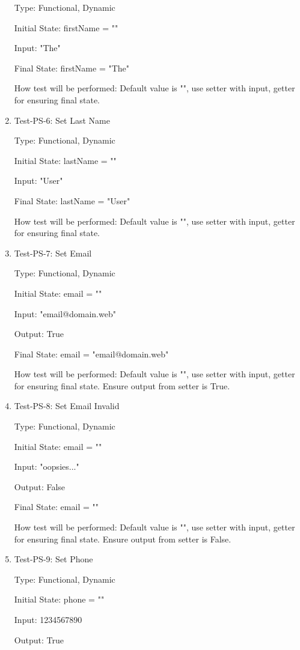 \documentclass[12pt, titlepage]{article}
\begin{document}
\begin{enumerate}
Type: Functional, Dynamic

Initial State: firstName = ""

Input: "The"

Final State: firstName = "The" 

How test will be performed: Default value is "", use setter with input, getter for ensuring final state.
\item{Test-PS-6: Set Last Name\\}

Type: Functional, Dynamic

Initial State: lastName = ""

Input: "User"

Final State: lastName = "User" 

How test will be performed: Default value is "", use setter with input, getter for ensuring final state. 
\item{Test-PS-7: Set Email\\}

Type: Functional, Dynamic

Initial State: email = ""

Input: "email@domain.web"

Output: True

Final State: email = "email@domain.web"

How test will be performed: Default value is "", use setter with input, getter for ensuring final state. Ensure output from setter is True.
\item{Test-PS-8: Set Email Invalid\\}

Type: Functional, Dynamic

Initial State: email = ""

Input: "oopsies..."

Output: False

Final State: email = ""

How test will be performed: Default value is "", use setter with input, getter for ensuring final state. Ensure output from setter is False.
\item{Test-PS-9: Set Phone\\}

Type: Functional, Dynamic

Initial State: phone = ""

Input: 1234567890

Output: True


\end{enumerate}
\end{document}
